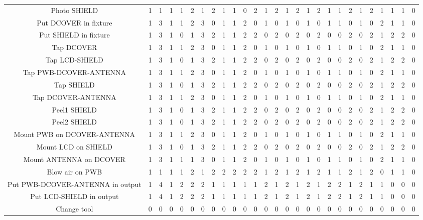 \documentclass[10pt,a4paper]{report}
\begin{document}
\begin{landscape}
\begin{tabular}{*{27}{c}}
Photo SHIELD & 1 & 1 & 1 & 1 & 2 & 1 & 2 & 1 & 1 & 0 & 2 & 1 & 2 & 1 & 2 & 1 & 2 & 1 & 1 & 2 & 1 & 2 & 1 & 1 & 1 & 0\\
Put DCOVER in fixture & 1 & 3 & 1 & 1 & 2 & 3 & 0 & 1 & 1 & 2 & 0 & 1 & 0 & 1 & 0 & 1 & 0 & 1 & 1 & 0 & 1 & 0 & 2 & 1 & 1 & 0\\
Put SHIELD in fixture & 1 & 3 & 1 & 0 & 1 & 3 & 2 & 1 & 1 & 2 & 2 & 0 & 2 & 0 & 2 & 0 & 2 & 0 & 0 & 2 & 0 & 2 & 1 & 2 & 2 & 0\\
Tap DCOVER & 1 & 3 & 1 & 1 & 2 & 3 & 0 & 1 & 1 & 2 & 0 & 1 & 0 & 1 & 0 & 1 & 0 & 1 & 1 & 0 & 1 & 0 & 2 & 1 & 1 & 0\\
Tap LCD-SHIELD & 1 & 3 & 1 & 0 & 1 & 3 & 2 & 1 & 1 & 2 & 2 & 0 & 2 & 0 & 2 & 0 & 2 & 0 & 0 & 2 & 0 & 2 & 1 & 2 & 2 & 0\\
Tap PWB-DCOVER-ANTENNA & 1 & 3 & 1 & 1 & 2 & 3 & 0 & 1 & 1 & 2 & 0 & 1 & 0 & 1 & 0 & 1 & 0 & 1 & 1 & 0 & 1 & 0 & 2 & 1 & 1 & 0\\
Tap SHIELD & 1 & 3 & 1 & 0 & 1 & 3 & 2 & 1 & 1 & 2 & 2 & 0 & 2 & 0 & 2 & 0 & 2 & 0 & 0 & 2 & 0 & 2 & 1 & 2 & 2 & 0\\
Tap DCOVER-ANTENNA & 1 & 3 & 1 & 1 & 2 & 3 & 0 & 1 & 1 & 2 & 0 & 1 & 0 & 1 & 0 & 1 & 0 & 1 & 1 & 0 & 1 & 0 & 2 & 1 & 1 & 0\\
Peel1 SHIELD & 1 & 3 & 1 & 0 & 1 & 3 & 2 & 1 & 1 & 2 & 2 & 0 & 2 & 0 & 2 & 0 & 2 & 0 & 0 & 2 & 0 & 2 & 1 & 2 & 2 & 0\\
Peel2 SHIELD & 1 & 3 & 1 & 0 & 1 & 3 & 2 & 1 & 1 & 2 & 2 & 0 & 2 & 0 & 2 & 0 & 2 & 0 & 0 & 2 & 0 & 2 & 1 & 2 & 2 & 0\\
Mount PWB on DCOVER-ANTENNA & 1 & 3 & 1 & 1 & 2 & 3 & 0 & 1 & 1 & 2 & 0 & 1 & 0 & 1 & 0 & 1 & 0 & 1 & 1 & 0 & 1 & 0 & 2 & 1 & 1 & 0\\
Mount LCD on SHIELD & 1 & 3 & 1 & 0 & 1 & 3 & 2 & 1 & 1 & 2 & 2 & 0 & 2 & 0 & 2 & 0 & 2 & 0 & 0 & 2 & 0 & 2 & 1 & 2 & 2 & 0\\
Mount ANTENNA on DCOVER & 1 & 3 & 1 & 1 & 1 & 3 & 0 & 1 & 1 & 2 & 0 & 1 & 0 & 1 & 0 & 1 & 0 & 1 & 1 & 0 & 1 & 0 & 2 & 1 & 1 & 0\\
Blow air on PWB & 1 & 1 & 1 & 1 & 2 & 1 & 2 & 2 & 2 & 2 & 2 & 1 & 2 & 1 & 2 & 1 & 2 & 1 & 1 & 2 & 1 & 2 & 0 & 1 & 1 & 0\\
Put PWB-DCOVER-ANTENNA in output & 1 & 4 & 1 & 2 & 2 & 2 & 1 & 1 & 1 & 1 & 1 & 2 & 1 & 2 & 1 & 2 & 1 & 2 & 2 & 1 & 2 & 1 & 1 & 0 & 0 & 0\\
Put LCD-SHIELD in output & 1 & 4 & 1 & 2 & 2 & 2 & 1 & 1 & 1 & 1 & 1 & 2 & 1 & 2 & 1 & 2 & 1 & 2 & 2 & 1 & 2 & 1 & 1 & 0 & 0 & 0\\
Change tool & 0 & 0 & 0 & 0 & 0 & 0 & 0 & 0 & 0 & 0 & 0 & 0 & 0 & 0 & 0 & 0 & 0 & 0 & 0 & 0 & 0 & 0 & 0 & 0 & 0 & 0 \\
\end{tabular}
\end{landscape}
\end{document}
